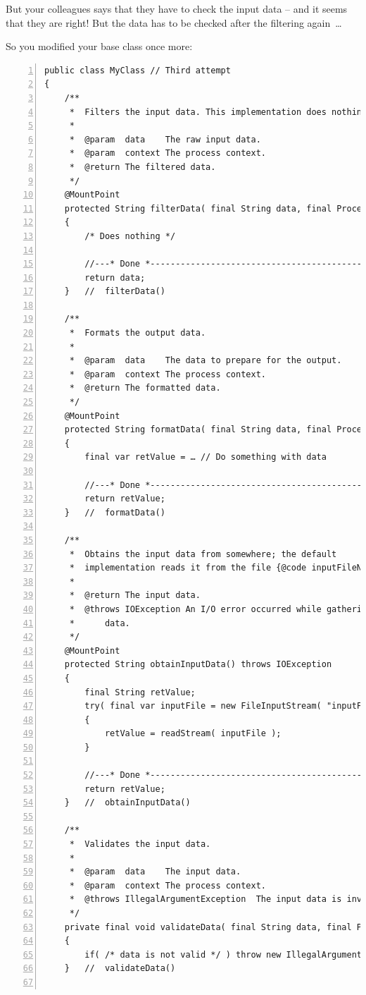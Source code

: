 \documentclass[11pt,a4paper, titlepage, parskip=half, headsepline, footsepline, cleardoublepage=current, headheight=1cm]{scrbook}
\begin{document}
But your colleagues says that they have to check the input data – and it seems that they are right! But the data has to be checked after the filtering again~…

So you modified your base class once more:
\begin{lstlisting}[numbers=left]
public class MyClass // Third attempt
{
    /**
     *  Filters the input data. This implementation does nothing.
     *  
     *  @param  data    The raw input data.
     *  @param  context The process context.
     *  @return	The filtered data.
     */
    @MountPoint 
    protected String filterData( final String data, final ProcessContext context )
    {
        /* Does nothing */
        
        //---* Done *------------------------------------------------
        return data;
    }   //  filterData()
    
    /**
     *  Formats the output data.
     * 
     *  @param  data    The data to prepare for the output.
     *  @param  context The process context.
     *  @return	The formatted data.
     */
    @MountPoint
    protected String formatData( final String data, final ProcessContext context )
    {
        final var retValue = … // Do something with data
        
        //---* Done *------------------------------------------------
        return retValue;
    }   //  formatData()
    
    /**
     *  Obtains the input data from somewhere; the default 
     *  implementation reads it from the file {@code inputFileName}.
     *
     *  @return The input data.
     *  @throws IOException An I/O error occurred while gathering the 
     *      data.
     */
    @MountPoint
    protected String obtainInputData() throws IOException
    {
        final String retValue;
        try( final var inputFile = new FileInputStream( "inputFileName" ) )
        {
            retValue = readStream( inputFile );
        }
        
        //---* Done *------------------------------------------------
        return retValue;
    }   //  obtainInputData()
        
    /**
     *  Validates the input data.
     *  
     *  @param  data    The input data.
     *  @param  context The process context.
     *  @throws IllegalArgumentException  The input data is invalid.
     */
    private final void validateData( final String data, final ProcessContext context )
    {
        if( /* data is not valid */ ) throw new IllegalArgumentException();
    }   //  validateData()
    

\end{lstlisting}
\end{document}
